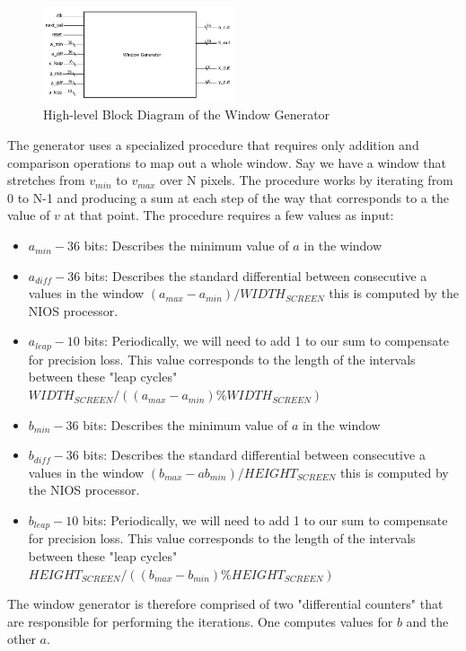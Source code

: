 \documentclass{article}
\begin{document}
\begin{figure}[H]
  \centering
    \includegraphics[width=160pt]{block_diagrams/win_gen.pdf}
  \caption{High-level Block Diagram of the Window Generator}
\end{figure}


The generator uses a specialized procedure that requires only addition
and comparison operations to map out a whole window. Say we have a
window that stretches from $v_{min}$ to $v_{max}$ over N pixels. The
procedure works by iterating from 0 to N-1 and producing a sum at each
step of the way that corresponds to a the value of $v$ at that
point. The procedure requires a few values as input:


\begin{itemize}
\item $a_{min} - 36$ bits: Describes the minimum value of $a$ in the window
\item $a_{diff} - 36$ bits: Describes the standard differential
  between consecutive a values in the window $(a_{max} -
  a_{min})/WIDTH_{SCREEN}$ this is computed by the NIOS processor.
\item $a_{leap} - 10$ bits: Periodically, we will need to add 1 to our
  sum to compensate for precision loss. This value corresponds to the
  length of the intervals between these "leap cycles"
  $WIDTH_{SCREEN}/((a_{max} - a_{min})\%WIDTH_{SCREEN})$
\item $b_{min} - 36$ bits: Describes the minimum value of $a$ in the window
\item $b_{diff} - 36$ bits: Describes the standard differential
  between consecutive a values in the window $(b_{max} -
  ab_{min})/HEIGHT_{SCREEN}$ this is computed by the NIOS processor.
\item $b_{leap} - 10$ bits: Periodically, we will need to add 1 to our
  sum to compensate for precision loss. This value corresponds to the
  length of the intervals between these "leap cycles"
  $HEIGHT_{SCREEN}/((b_{max} - b_{min})\%HEIGHT_{SCREEN})$
\end{itemize}

The window generator is therefore comprised of two "differential
counters" that are responsible for performing the iterations. One
computes values for $b$ and the other $a$.
\end{document}
